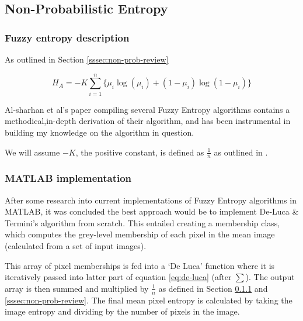 \subsection{Non-Probabilistic Entropy}
\label{ssec:non-prob-sec}

\subsubsection{Fuzzy entropy description}
\label{sssec:desc}

As outlined in Section \ref{sssec:non-prob-review}


\begin{equation}
  \label{eq:de-luca}
  H_A = -K \displaystyle\sum_{i=1}^{n}{\{\mu_i\log(\mu_i) + (1 - \mu_i)\log(1 - \mu_i)\}}
\end{equation}

Al-sharhan et al's paper compiling several Fuzzy Entropy algorithms \cite{Al-Sharhan_Karray_Gueaieb_Basir_2001} contains a methodical,in-depth derivation of their algorithm, and has been instrumental in building my knowledge on the algorithm in question.

We will assume $-K$, the positive constant, is defined as $\frac{1}{n}$ as outlined in \cite{DeLuca_Termini_1972}.

\subsubsection{MATLAB implementation}

After some research into current implementations of Fuzzy Entropy algorithms in MATLAB, it was concluded the best approach would be to implement De-Luca \& Termini's algorithm from scratch. This entailed creating a membership class, which computes the grey-level membership of each pixel in the mean image (calculated from a set of input images).

This array of pixel memberships is fed into a `De Luca' function where it is iteratively passed into latter part of equation \ref{eq:de-luca} (after $\displaystyle\sum$). The output array is then summed and multiplied by $\frac{1}{n}$ as defined in Section \ref{sssec:desc} and \ref{sssec:non-prob-review}. The final mean pixel entropy is calculated by taking the image entropy and dividing by the number of pixels in the image.

